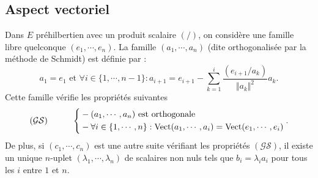 \subsection{Aspect vectoriel}
Dans $E$ préhilbertien avec un produit scalaire $(/)$, on considère une famille libre quelconque $(e_1,\cdots,e_n)$. La famille $(a_1,\cdots,a_n)$ (dite orthogonalisée par la méthode de Schmidt) est définie par :
\begin{displaymath}
 a_1 = e_1 \text{ et }
\forall i \in\{1,\cdots, n-1\} : a_{i+1} = e_{i+1}-\sum_{k=1}^i\frac{(e_{i+1}/a_k)}{\Vert a_k\Vert^2}a_k.
\end{displaymath}
Cette famille vérifie les propriétés suivantes
\begin{displaymath}
 (\mathcal {GS})\hspace{1cm}
\left\lbrace
\begin{aligned}
 &- (a_1,\cdots,a_n) \text{ est orthogonale} \\
 &- \forall i\in\{1,\cdots,n\} : \mathop{\mathrm{Vect}}(a_1,\cdots,a_i)=\mathop{\mathrm{Vect}}(e_1,\cdots,e_i)
\end{aligned}
 \right. .
\end{displaymath}
De plus, si $(c_1,\cdots,c_n)$ est une autre suite vérifiant les propriétés $(\mathcal{GS})$, il existe un unique $n$-uplet $(\lambda_1,\cdots,\lambda_n)$ de scalaires non nuls tels que $b_i=\lambda_i a_i$ pour tous les $i$ entre $1$ et $n$.

